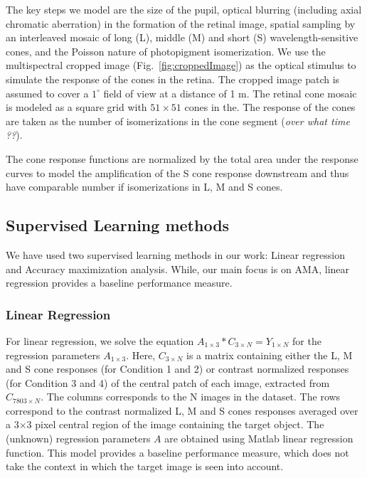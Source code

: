 \documentclass{jov}
\begin{document}
The key steps we model are the size of the pupil, optical blurring (including axial chromatic aberration) in the formation of the retinal image, spatial sampling by an interleaved mosaic of long (L), middle (M)  and short (S) wavelength-sensitive cones, and the Poisson nature of photopigment isomerization.
We use the multispectral cropped image (Fig.~\ref{fig:croppedImage}) as the optical stimulus to simulate the response of the cones in the retina. The cropped image patch is assumed to cover a $1^{\circ}$ field of view at a distance of 1 m. The retinal cone mosaic is modeled as a square grid with $51 \times 51$ cones in the. The response of the cones are taken as the number of isomerizations in the cone segment ({\it over what time ??}).

The cone response functions are normalized by the total area under the response curves to model the amplification of the S cone response downstream and thus have comparable number if isomerizations in L, M and S cones. 



\subsection{Supervised Learning methods} \label{method:SupervisedLearning}
We have used two supervised learning methods in our work: Linear regression and Accuracy maximization analysis. While, our main focus is on AMA, linear regression provides a baseline performance measure.

\subsubsection*{Linear Regression} For linear regression, we solve the equation $A_{1\times3}*C_{3\times N} = Y_{1\times N}$ for the regression parameters $A_{1\times3}$. Here, $C_{3\times N}$ is a matrix containing either the L, M and S cone responses (for Condition 1 and 2) or contrast normalized responses (for Condition 3 and 4) of the central patch of each image, extracted from $C_{7803\times N}$.  The columns corresponds to the N images in the dataset. The rows correspond to the contrast normalized L, M and S cones responses averaged over a 3$\times$3 pixel central region of the image containing the target object.  The (unknown) regression parameters $A$ are obtained using Matlab linear regression function. This model provides a baseline performance measure, which does not take the context in which the target image is seen into account.
\end{document}
